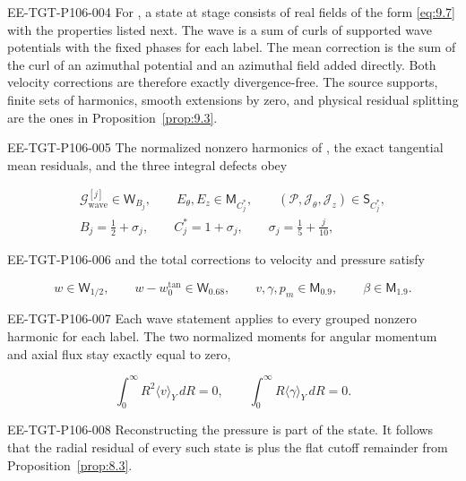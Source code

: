 \begin{definition}\label{def:9.4}
\begin{EESegment}{EE-TGT-P106-004}
For , a state at stage
 consists of real fields of the form \eqref{eq:9.7} with the properties
listed next. The wave  is a sum of curls of supported wave potentials with
the fixed phases for each label. The mean correction
 is the sum of the curl of an azimuthal potential and an
azimuthal field added directly. Both velocity corrections are therefore exactly divergence-free.
The source supports, finite sets of harmonics, smooth extensions by zero, and physical residual
splitting are the ones in Proposition~\ref{prop:9.3}.
\end{EESegment}

\begin{EESegment}{EE-TGT-P106-005}
The normalized nonzero harmonics  of
, the exact tangential mean residuals, and the three
integral defects obey
\end{EESegment}
\begin{equation}
\begin{gathered}
\mathcal G_{\mathrm{wave}}^{[j]}\in \mathsf W_{B_j},
\qquad E_\theta,E_z\in \mathsf M_{C_j^*},
\qquad (\mathcal P,\mathcal J_\theta,\mathcal J_z)\in \mathsf S_{C_j^*},\\
B_j=\frac12+\sigma_j,
\qquad C_j^*=1+\sigma_j,
\qquad \sigma_j=\frac15+\frac{j}{10},
\end{gathered}
\tag{9.8}\label{eq:9.8}
\end{equation}
\begin{EESegment}{EE-TGT-P106-006}
and the total corrections to velocity and pressure satisfy
\end{EESegment}
\begin{equation}
w\in \mathsf W_{1/2},
\qquad w-w_0^{\mathrm{tan}}\in \mathsf W_{0.68},
\qquad v,\gamma,p_m\in \mathsf M_{0.9},
\qquad \beta\in \mathsf M_{1.9}.
\tag{9.9}\label{eq:9.9}
\end{equation}
\begin{EESegment}{EE-TGT-P106-007}
Each wave statement applies to every grouped nonzero harmonic for each label. The two normalized
moments for angular momentum and axial flux stay exactly equal to zero,
\end{EESegment}
\begin{equation}
\int_0^\infty R^2\langle v\rangle_Y\,dR=0,
\qquad
\int_0^\infty R\langle\gamma\rangle_Y\,dR=0.
\tag{9.10}\label{eq:9.10}
\end{equation}
\begin{EESegment}{EE-TGT-P106-008}
Reconstructing the pressure is part of the state. It follows that the radial residual of every such
state is  plus the flat cutoff remainder from
Proposition~\ref{prop:8.3}.
\end{EESegment}
\end{definition}

